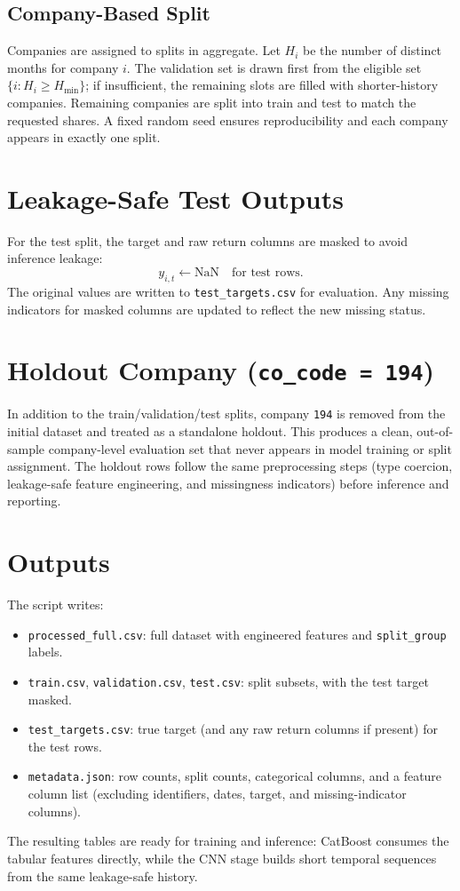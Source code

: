 \documentclass[11pt]{article}
\begin{document}
\subsection{Company-Based Split}

Companies are assigned to splits in aggregate. Let $H_i$ be the number of
distinct months for company $i$. The validation set is drawn first from the
eligible set $\{i : H_i \ge H_{\min}\}$; if insufficient, the remaining slots are
filled with shorter-history companies. Remaining companies are split into train
and test to match the requested shares. A fixed random seed ensures
reproducibility and each company appears in exactly one split.

\section{Leakage-Safe Test Outputs}

For the test split, the target and raw return columns are masked to avoid
inference leakage:
\[
y_{i,t} \leftarrow \text{NaN} \quad \text{for test rows}.
\]
The original values are written to \texttt{test\_targets.csv} for evaluation. Any
missing indicators for masked columns are updated to reflect the new missing
status.

\section{Holdout Company (\texttt{co\_code = 194})}

In addition to the train/validation/test splits, company \texttt{194} is removed
from the initial dataset and treated as a standalone holdout. This produces a
clean, out-of-sample company-level evaluation set that never appears in model
training or split assignment. The holdout rows follow the same preprocessing
steps (type coercion, leakage-safe feature engineering, and missingness
indicators) before inference and reporting.

\section{Outputs}

The script writes:
\begin{itemize}
	\item \texttt{processed\_full.csv}: full dataset with engineered features and
	\texttt{split\_group} labels.
	\item \texttt{train.csv}, \texttt{validation.csv}, \texttt{test.csv}: split
	subsets, with the test target masked.
	\item \texttt{test\_targets.csv}: true target (and any raw return columns if
	present) for the test rows.
	\item \texttt{metadata.json}: row counts, split counts, categorical columns,
	and a feature column list (excluding identifiers, dates, target, and
	missing-indicator columns).
\end{itemize}

The resulting tables are ready for training and inference: CatBoost consumes the
tabular features directly, while the CNN stage builds short temporal sequences
from the same leakage-safe history.
\end{document}
